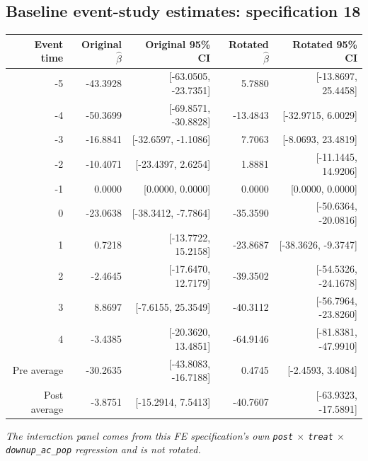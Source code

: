 \documentclass[10pt]{article}
\begin{document}
\subsection*{Baseline event-study estimates: specification 18}
\begin{center}
\scriptsize
\begin{tabular}{r rr rr}
\toprule
Event time & Original $\hat\beta$ & Original 95\% CI & Rotated $\hat\beta$ & Rotated 95\% CI \\
\midrule
-5 & -43.3928 & [-63.0505, -23.7351] & 5.7880 & [-13.8697, 25.4458] \\
-4 & -50.3699 & [-69.8571, -30.8828] & -13.4843 & [-32.9715, 6.0029] \\
-3 & -16.8841 & [-32.6597, -1.1086] & 7.7063 & [-8.0693, 23.4819] \\
-2 & -10.4071 & [-23.4397, 2.6254] & 1.8881 & [-11.1445, 14.9206] \\
-1 & 0.0000 & [0.0000, 0.0000] & 0.0000 & [0.0000, 0.0000] \\
0 & -23.0638 & [-38.3412, -7.7864] & -35.3590 & [-50.6364, -20.0816] \\
1 & 0.7218 & [-13.7722, 15.2158] & -23.8687 & [-38.3626, -9.3747] \\
2 & -2.4645 & [-17.6470, 12.7179] & -39.3502 & [-54.5326, -24.1678] \\
3 & 8.8697 & [-7.6155, 25.3549] & -40.3112 & [-56.7964, -23.8260] \\
4 & -3.4385 & [-20.3620, 13.4851] & -64.9146 & [-81.8381, -47.9910] \\
\midrule
Pre average & -30.2635 & [-43.8083, -16.7188] & 0.4745 & [-2.4593, 3.4084] \\
Post average & -3.8751 & [-15.2914, 7.5413] & -40.7607 & [-63.9323, -17.5891] \\
\bottomrule
\end{tabular}
\end{center}
\medskip
\textit{The interaction panel comes from this FE specification's own \texttt{post} $\times$ \texttt{treat} $\times$ \texttt{downup\_ac\_pop} regression and is not rotated.}
\clearpage
\end{document}
